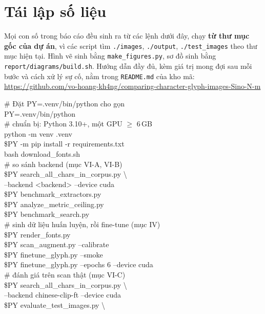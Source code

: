 \documentclass[conference,a4paper]{IEEEtran}
\newcommand{\code}[1]{{\small\texttt{#1}}}
\begin{document}
\appendices
\section{Tái lập số liệu}

Mọi con số trong báo cáo đều sinh ra từ các lệnh dưới đây, chạy \textbf{từ thư mục gốc của dự án}, vì
các script tìm \code{./images}, \code{./output}, \code{./test\_images} theo thư mục hiện tại. Hình vẽ
sinh bằng \code{make\_figures.py}, sơ đồ sinh bằng \code{report/diagrams/build.sh}. Hướng dẫn đầy đủ,
kèm giá trị mong đợi sau mỗi bước và cách xử lý sự cố, nằm trong \code{README.md} của kho mã:
\url{https://github.com/vo-hoang-kh4ng/comparing-character-glyph-images-Sino-N-m}

{\footnotesize\ttfamily\raggedright
\# Đặt PY=.venv/bin/python cho gọn\\
PY=.venv/bin/python\\[4pt]
\# chuẩn bị: Python 3.10+, một GPU $\geq$ 6\,GB\\
python -m venv .venv\\
\$PY -m pip install -r requirements.txt\\
bash download\_fonts.sh\\[4pt]
\# so sánh backend (mục VI-A, VI-B)\\
\$PY search\_all\_chars\_in\_corpus.py \textbackslash\\
\hspace*{1em}--backend <backend> --device cuda\\
\$PY benchmark\_extractors.py\\
\$PY analyze\_metric\_ceiling.py\\
\$PY benchmark\_search.py\\[4pt]
\# sinh dữ liệu huấn luyện, rồi fine-tune (mục IV)\\
\$PY render\_fonts.py\\
\$PY scan\_augment.py --calibrate\\
\$PY finetune\_glyph.py --smoke\\
\$PY finetune\_glyph.py --epochs 6 --device cuda\\[4pt]
\# đánh giá trên scan thật (mục VI-C)\\
\$PY search\_all\_chars\_in\_corpus.py \textbackslash\\
\hspace*{1em}--backend chinese-clip-ft --device cuda\\
\$PY evaluate\_test\_images.py \textbackslash\\
}
\end{document}
